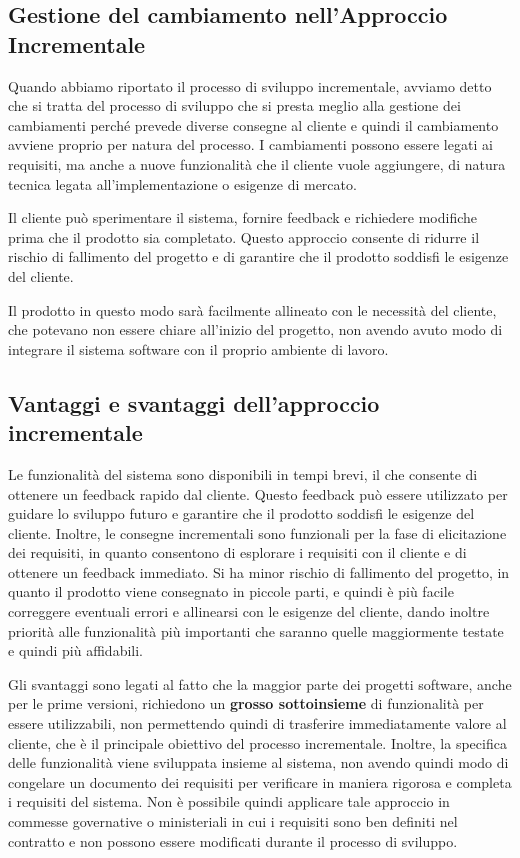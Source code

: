 \subsection{Gestione del cambiamento nell'Approccio Incrementale}
Quando abbiamo riportato il processo di sviluppo incrementale, avviamo detto che 
si tratta del processo di sviluppo che si presta meglio alla gestione dei cambiamenti
perché prevede diverse consegne al cliente e quindi il cambiamento avviene proprio 
per natura del processo. I cambiamenti possono essere legati ai requisiti, ma anche
a nuove funzionalità che il cliente vuole aggiungere, di natura tecnica legata
all'implementazione o esigenze di mercato.

Il cliente può sperimentare il sistema, fornire feedback e richiedere modifiche
prima che il prodotto sia completato. Questo approccio consente di ridurre il rischio
di fallimento del progetto e di garantire che il prodotto soddisfi le esigenze del
cliente. 

Il prodotto in questo modo sarà facilmente allineato con le necessità del cliente,
che potevano non essere chiare all'inizio del progetto, non avendo avuto modo di
integrare il sistema software con il proprio ambiente di lavoro.
\subsection{Vantaggi e svantaggi dell'approccio incrementale}
Le funzionalità del sistema sono disponibili in tempi brevi, il che consente
di ottenere un feedback rapido dal cliente. Questo feedback può essere utilizzato
per guidare lo sviluppo futuro e garantire che il prodotto soddisfi le esigenze
del cliente. Inoltre, le consegne incrementali sono funzionali per la fase 
di elicitazione dei requisiti, in quanto consentono di esplorare i requisiti
con il cliente e di ottenere un feedback immediato.
Si ha minor rischio di fallimento del progetto, in quanto il prodotto viene
consegnato in piccole parti, e quindi è più facile correggere eventuali errori
e allinearsi con le esigenze del cliente, dando inoltre priorità alle funzionalità
più importanti che saranno quelle maggiormente testate e quindi più affidabili.

Gli svantaggi sono legati al fatto che la maggior parte dei progetti software,
anche per le prime versioni, richiedono un \textbf{grosso sottoinsieme} di funzionalità
per essere utilizzabili, non permettendo quindi di trasferire immediatamente 
valore al cliente, che è il principale obiettivo del processo incrementale.
Inoltre, la specifica delle funzionalità viene sviluppata insieme al sistema,
non avendo quindi modo di congelare un documento dei requisiti per verificare 
in maniera rigorosa e completa i requisiti del sistema.
Non è possibile quindi applicare tale approccio in commesse governative o 
ministeriali in cui i requisiti sono ben definiti nel contratto
e non possono essere modificati
durante il processo di sviluppo.